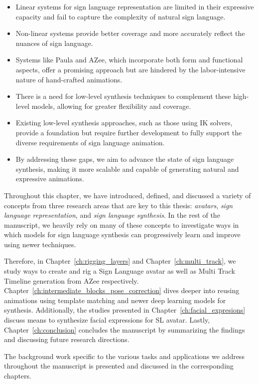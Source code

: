 \documentclass[../../main.tex]{subfiles}
\begin{document}
\begin{itemize} 
  \item Linear systems for sign language representation are limited in their expressive capacity and fail to capture the complexity of natural sign language.
  \item Non-linear systems provide better coverage and more accurately reflect the nuances of sign language.
  \item Systems like Paula and AZee, which incorporate both form and functional aspects, offer a promising approach but are hindered by the labor-intensive nature of hand-crafted animations.
  \item There is a need for low-level synthesis techniques to complement these high-level models, allowing for greater flexibility and coverage.
  \item Existing low-level synthesis approaches, such as those using IK solvers, provide a foundation but require further development to fully support the diverse requirements of sign language animation.
  \item By addressing these gaps, we aim to advance the state of sign language synthesis, making it more scalable and capable of generating natural and expressive animations.
\end{itemize}

Throughout this chapter, we have introduced, defined, and discussed a variety of concepts from three research areas that are key to this thesis: \textit{avatars}, \textit{sign language representation}, and \textit{sign language synthesis}. In the rest of the manuscript, we heavily rely on many of these concepts to investigate ways in which models for sign language synthesis can progressively learn and improve using newer techniques.

Therefore, in Chapter~\ref{ch:rigging_layers} and Chapter~\ref{ch:multi_track}, we study ways to create and rig a Sign Language avatar as well as Multi Track Timeline generation from AZee respectively. Chapter~\ref{ch:intermediate_blocks_pose_correction} dives deeper into reusing animations using template matching and newer deep learning models for synthesis. Additionally, the studies presented in Chapter~\ref{ch:facial_expresions} discuss means to synthesize facial expressions for SL avatar. Lastly, Chapter~\ref{ch:conclusion} concludes the manuscript by summarizing the findings and discussing future research directions.

The background work specific to the various tasks and applications we address throughout the manuscript is presented and discussed in the corresponding chapters.
\end{document}
